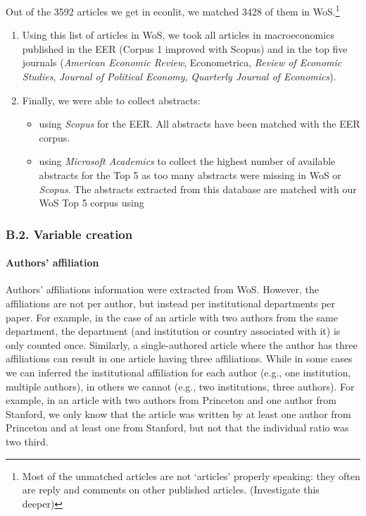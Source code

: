 \documentclass[]{elsarticle} %
\providecommand{\tightlist}{%
  \setlength{\itemsep}{0pt}\setlength{\parskip}{0pt}}
\begin{document}
Out of the 3592 articles we get in econlit, we matched 3428 of them in
WoS.\footnote{Most of the unmatched articles are not `articles' properly
  speaking: they often are reply and comments on other published
  articles. (Investigate this deeper)}

\begin{enumerate}
\def\labelenumi{\arabic{enumi}.}
\setcounter{enumi}{2}
\item
  Using this list of articles in WoS, we took all articles in
  macroeconomics published in the EER (Corpus 1 improved with Scopus)
  and in the top five journals (\emph{American Economic Review},
  Econometrica, \emph{Review of Economic Studies}, \emph{Journal of
  Political Economy}, \emph{Quarterly Journal of Economics}).
\item
  Finally, we were able to collect abstracts:

  \begin{itemize}
  \tightlist
  \item
    using \emph{Scopus} for the EER. All abstracts have been matched
    with the EER corpus.
  \item
    using \emph{Microsoft Academics} to collect the highest number of
    available abstracts for the Top 5 as too many abstracts were missing
    in WoS or \emph{Scopus}. The abstracts extracted from this database
    are matched with our WoS Top 5 corpus using
  \end{itemize}
\end{enumerate}

\hypertarget{b.2.-variable-creation}{%
\subsubsection*{B.2. Variable creation}\label{b.2.-variable-creation}}

\hypertarget{author-affiliation}{%
\paragraph*{Authors' affiliation}\label{author-affiliation}}

Authors' affiliations information were extracted from WoS. However, the
affiliations are not per author, but instead per institutional
departments per paper. For example, in the case of an article with two
authors from the same department, the department (and institution or
country associated with it) is only counted once. Similarly, a
single-authored article where the author has three affiliations can
result in one article having three affiliations. While in some cases we
can inferred the institutional affiliation for each author (e.g., one
institution, multiple authors), in others we cannot (e.g., two
institutions, three authors). For example, in an article with two
authors from Princeton and one author from Stanford, we only know that
the article was written by at least one author from Princeton and at
least one from Stanford, but not that the individual ratio was two
third.
\end{document}
